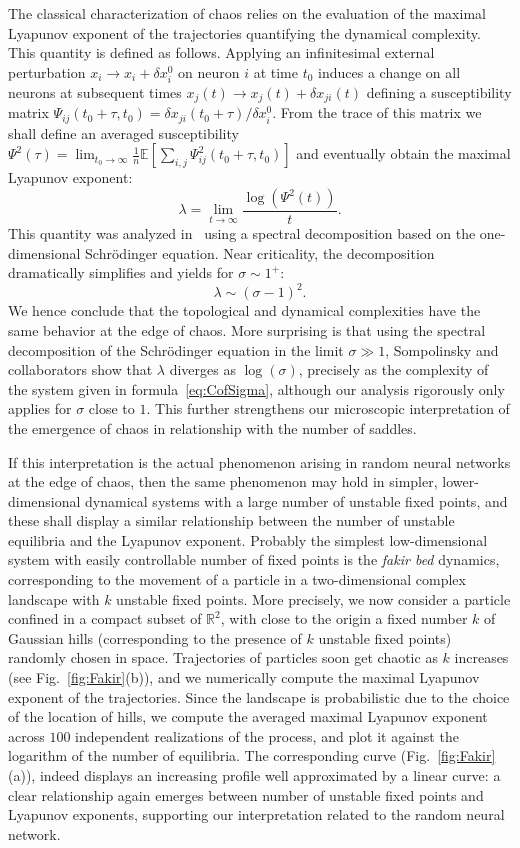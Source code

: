 The classical characterization of chaos relies on the evaluation of the maximal Lyapunov exponent of the trajectories quantifying the dynamical complexity. This quantity is defined as follows. Applying
 an infinitesimal external perturbation $x_i\to x_i+\delta x_i^0$ on neuron $i$ at time $t_0$ induces a change on all neurons at subsequent times $x_j(t)\to
 x_j(t)+\delta x_{ji}(t)$ defining a susceptibility matrix $\Psi_{ij}(t_0+\tau,t_0)=\delta x_{ji}(t_0+\tau)/\delta x_i^0$. From the trace of this matrix we shall define an averaged susceptibility $\Psi^2(\tau)=\lim_{t_0\to\infty} \frac 1 n {\mathbb{E}\left [ {\sum_{i,j} \Psi_{ij}^2(t_0+\tau,t_0)} \right]}$ and eventually obtain the maximal Lyapunov exponent:
\[\lambda = \lim_{t\to\infty} \frac {\log(\Psi^2(t))} {t}.\]  
This quantity was analyzed in~\cite{sompolinsky-crisanti-etal:88} using a spectral decomposition based on the one-dimensional Schr\"odinger equation. Near criticality, the decomposition dramatically simplifies and yields for $\sigma\sim 1^+$:
\[\lambda \sim {(\sigma-1)^2}.\]
We hence conclude that the topological and dynamical complexities have the same behavior at the edge of chaos.
More surprising is that using the spectral decomposition of the Schr\"odinger equation in the limit $\sigma \gg 1$, Sompolinsky and collaborators show that $\lambda$ diverges as $\log(\sigma)$, precisely as the complexity of the system given in formula~\eqref{eq:CofSigma}, although our analysis rigorously only applies for $\sigma$ close to $1$. 
This further strengthens our microscopic interpretation of the emergence of chaos in relationship with the number of saddles. 

If this interpretation is the actual phenomenon arising in random neural networks at the edge of chaos, then the same phenomenon may hold in simpler, lower-dimensional dynamical systems with a large number of unstable fixed points, and these shall display a similar relationship between the number of unstable equilibria and the Lyapunov exponent. Probably the simplest low-dimensional system with easily controllable number of fixed points is the \emph{fakir bed} dynamics, corresponding to the movement of a particle in a two-dimensional complex landscape with $k$ unstable fixed points. More precisely, we now consider a particle confined in a compact subset of ${\mathbb{R}}^2$, with close to the origin a fixed number $k$ of Gaussian hills (corresponding to the presence of $k$ unstable fixed points) randomly chosen in space. Trajectories of particles soon get chaotic as $k$ increases (see Fig.~\ref{fig:Fakir}(b)), and we numerically compute the maximal Lyapunov exponent of the trajectories. Since the landscape is probabilistic due to the choice of the location of hills, we compute the averaged maximal Lyapunov exponent across $100$ independent realizations of the process, and plot it against the logarithm of the number of equilibria. The corresponding curve (Fig.~\ref{fig:Fakir}(a)), indeed displays an increasing profile well approximated by a linear curve: a clear relationship again emerges between number of unstable fixed points and Lyapunov exponents, supporting our interpretation related to the random neural network.

